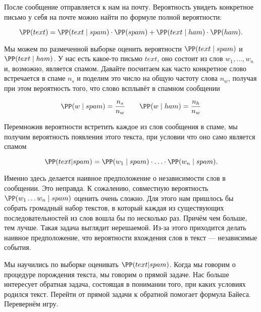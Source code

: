 \begin{center}
\end{center}

После сообщение отправляется к нам на почту. Вероятность увидеть конкретное письмо у себя на почте можно найти по формуле полной вероятности: 

\[ \PP(text) = \PP(text \mid spam) \cdot \PP(spam)  + \PP(text \mid ham) \cdot \PP(ham).\] 

Мы можем по размеченной выборке оценить вероятности $\PP(text \mid spam)$ и $ \PP(text \mid ham) $.  У нас есть какое-то письмо $text$, оно состоит из слов $w_1, \ldots, w_n$ и, возможно, является спамом.  Давайте посчитаем как часто конкретное слово встречается в спаме  $n_s$ и поделим это число на общую частоту слова $n_w$, получая при этом вероятность того, что слово всплывёт в спамном сообщении

\[\PP(w \mid spam) = \frac{n_s}{n_w} \qquad  \PP(w \mid ham) = \frac{n_h}{n_w} \]

Перемножив вероятности встретить каждое из слов сообщения в спаме, мы получим вероятность появления этого текста, при условии что оно само является спамом

\[ \PP(text | spam ) = \PP(w_1 \mid spam) \cdot \ldots \cdot \PP(w_n \mid spam).\]

Именно здесь делается наивное предположение о независимости слов в сообщении.  Это неправда. К сожалению, совместную вероятность $\PP(w_1 \ldots w_n \mid spam)$ оценить очень сложно. Для этого нам пришлось бы собрать громадный набор текстов, в который каждая из существующих последовательностей из слов вошла бы по несколько раз. Причём чем больше, тем лучше. Такая задача выглядит нерешаемой. Из-за этого приходится делать наивное предположение, что вероятности вхождения слов в текст --- независимые события. 

Мы научились по выборке оценивать  $ \PP(text | spam ) $.  Когда мы говорим о процедуре порождения текста, мы говорим о прямой задаче. Нас больше интересует обратная задача, состоящая в понимании того, при каких условиях родился текст. Перейти от прямой задачи к обратной помогает формула Байеса. Перевернём игру. 

